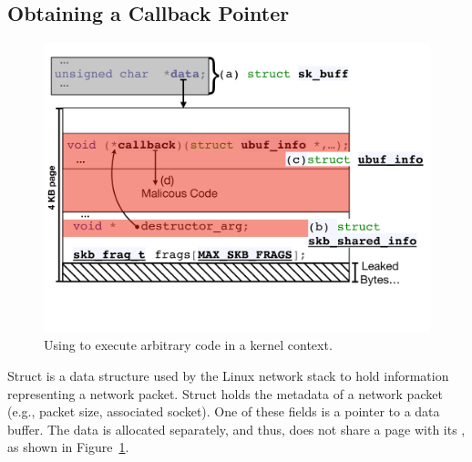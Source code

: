 
\subsection{Obtaining a Callback Pointer}\label{sec:shinfo_exploit}
\begin{figure}[t]
    \centering
    \includegraphics[width=0.8\linewidth]{figs/ubuf.pdf}
    \caption{Using \shinfo{} to execute arbitrary code in a kernel context.}
    \label{fig:sh_info}
\end{figure}

Struct \skb{} is a data structure used by the Linux network stack to hold information representing a network packet. Struct \skb{} holds the metadata of a network packet (e.g., packet size, associated socket). One of these fields is a pointer to a data buffer. The data is allocated separately, and thus, does not share a page with its \skb{}, as shown in Figure~\ref{fig:sh_info}. 

